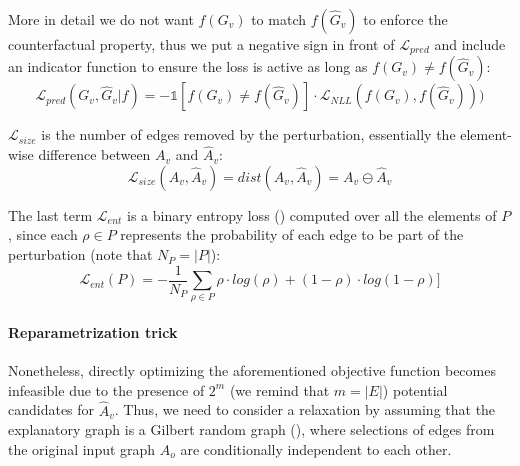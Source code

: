 \documentclass[binding=0.6cm]{sapthesis}
\newcommand{\mycite}[1]{(\cite{#1})}
\begin{document}
More in detail we do not want $f(G_v)$ to match $f(\hat{G}_v)$ to enforce the counterfactual property, thus we put a negative sign in front of $\mathcal{L}_{pred}$ and include an indicator function to ensure the loss is active as long as $f(G_v) \ne f(\hat{G}_v)$:
\begin{equation}
    \mathcal{L}_{pred}(G_v,\hat{G}_v|f) = -\mathbb{1}[f(G_v) \ne f(\hat{G}_v)] \cdot \mathcal{L}_{NLL}(f(G_v),f(\hat{G}_v)))
\end{equation}

$\mathcal{L}_{size}$ is the number of edges removed by the perturbation, essentially the element-wise difference between $A_v$ and $\hat{A}_v$: 
\begin{equation}
    \mathcal{L}_{size}(A_v,\hat{A}_v) = dist(A_v,\hat{A}_v) = A_v \ominus \hat{A}_v 
\end{equation}

The last term $\mathcal{L}_{ent}$ is a binary entropy loss \mycite{Goodfellow-et-al-2016} computed over all the elements of $P$, since each $\rho \in P$ represents the probability of each edge to be part of the perturbation (note that $N_P = |P|$):
\begin{equation}
    \mathcal{L}_{ent}(P) = - \frac{1}{N_P} \sum_{\rho \in P} \rho \cdot log(\rho) + (1 - \rho)\cdot log(1 - \rho)]
\end{equation}


\bigskip
\paragraph{Reparametrization trick}
\label{sec:cfpg.my.discrete-latent}
Nonetheless, directly optimizing the aforementioned objective function becomes infeasible due to the presence of $2^m$ (we remind that $m = |E|$) potential candidates for $\hat{A}_v$.
Thus, we need to consider a relaxation by assuming that the explanatory graph is a Gilbert random graph \mycite{gilbert1959-random-graphs}, where selections of edges from the original input graph $A_o$ are conditionally independent to each other.
\end{document}
